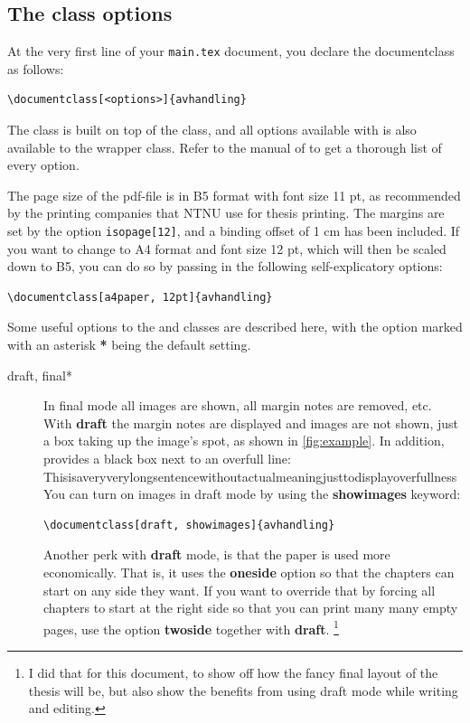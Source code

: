 \subsection{The class options}
At the very first line of your \texttt{main.tex} document, you declare the documentclass as follows:
\begin{lstlisting}
\documentclass[<options>]{avhandling}
\end{lstlisting}
The class is built on top of the \memoir class, and all options available with \memoir is also available to the \avhandling wrapper class.
Refer to the manual of \memoir to get a thorough list of every option.

	The page size of the pdf-file is in B5 format with font size 11 pt, as recommended by the printing companies that NTNU use for thesis printing.
	The margins are set by the \memoir option \texttt{isopage[12]}, and a binding offset of 1 cm has been included.
	If you want to change to A4 format and font size 12 pt, which will then be scaled down to B5, you can do so by passing in the following self-explicatory options:
\begin{lstlisting}
\documentclass[a4paper, 12pt]{avhandling}
\end{lstlisting}

Some useful options to the \avhandling and \memoir classes are described here, with the option marked with an asterisk \textbf{*} being the default setting.
\begin{description}
	\item[draft, final*]
	In final mode all images are shown, all margin notes are removed, etc.
	With \textbf{draft} the margin notes are displayed and images are not shown, just a box taking up the image's spot, as shown in \cref{fig:example}.
	In addition, \memoir provides a black box next to an overfull line:
	\mbox{Thisisaveryverylongsentencewithoutactualmeaningjusttodisplayoverfullness}
	You can turn on images in draft mode by using the \textbf{showimages} keyword:
\begin{lstlisting}
\documentclass[draft, showimages]{avhandling}
\end{lstlisting}
	Another perk with \textbf{draft} mode, is that the paper is used more economically.
	That is, it uses the \textbf{oneside} \memoir option so that the chapters can start on any side they want.
	If you want to override that by forcing all chapters to start at the right side so that you can print many many empty pages, use the \memoir option \textbf{twoside} together with \textbf{draft}.
\footnote{I did that for this document, to show off how the fancy final layout of the thesis will be, but also show the benefits from using draft mode while writing and editing.}
\end{description}


